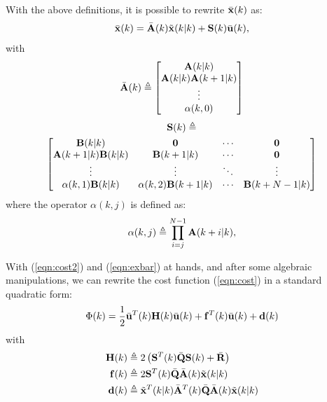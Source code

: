 \documentclass[conference]{IEEEtran} %
\begin{document}
With the above definitions, it is possible to rewrite $\bar{\bf x}(k)$ as:
\begin{equation}\label{eqn:exbar}
	\bar{\bf x}(k) = \bar{\bf A}(k)\tilde{\bf x}(k|k)+{\bf S}(k)\bar{\bf u}(k),
\end{equation}
with
\begin{equation*}
	\bar{\bf A}(k) \triangleq \begin{bmatrix}
		{\bf A}(k|k) \\ {\bf A}(k|k){\bf A}(k+1|k) \\ \vdots \\ \alpha(k,0)
	\end{bmatrix}
\end{equation*}
{\small
\begin{multline*}
		{\bf S}(k) \triangleq \\ \begin{bmatrix}
			{\bf B}(k|k)		       & {\bf 0} 			    	 & \cdots & {\bf 0}         \\
			{\bf A}(k+1|k){\bf B}(k|k) & {\bf B}(k+1|k)      	 & \cdots & {\bf 0}         \\
			\vdots			       & \vdots				 & \ddots & \vdots          \\
			\alpha(k,1){\bf B}(k|k)    & \alpha(k,2){\bf B}(k+1|k) & \cdots & {\bf B}(k+N-1|k)
		\end{bmatrix}
\end{multline*}
}
where the operator $\alpha(k,j)$ is defined as:
\begin{equation*}
	\alpha(k,j) \triangleq \prod_{i=j}^{N-1}{\bf A}(k+i|k),
\end{equation*}

With (\ref{eqn:cost2}) and (\ref{eqn:exbar}) at hands, and after some algebraic manipulations, we can rewrite the cost function (\ref{eqn:cost}) in a standard quadratic form:
\begin{equation}
	\Phi(k) = \frac{1}{2}\bar{\bf u}^T(k){\bf H}(k)\bar{\bf u}(k) + {\bf f}^T(k)\bar{\bf u}(k) + {\bf d}(k)
\end{equation}
with
\begin{align*}
	{\bf H}(k) &\triangleq 2\left({\bf S}^T(k)\bar{\bf Q}{\bf S}(k)+\bar{\bf R}\right) \\
	{\bf f}(k) &\triangleq 2{\bf S}^T(k)\bar{\bf Q}\bar{\bf A}(k)\tilde{\bf x}(k|k) \\
	{\bf d}(k) &\triangleq \tilde{\bf x}^T(k|k)\bar{\bf A}^T(k)\bar{\bf Q}\bar{\bf A}(k)\tilde{\bf x}(k|k)
\end{align*}
\end{document}
